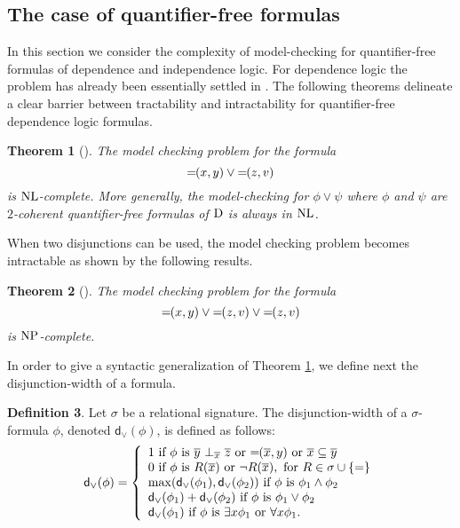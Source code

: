\documentclass{article}
\theoremstyle{plain}
\newtheorem{theorem}{Theorem}
\theoremstyle{definition}
\newtheorem{definition}[theorem]{Definition}
\newcommand{\sg}{\sigma}
\newcommand*\dep{{=\mkern-1.2mu}}
\newcommand{\df}{\rm{D}}
\newcommand{\np}{{\rm NP}}
\newcommand{\nl}{{\rm NL}}
\newcommand{\tu}[1]{\overline{#1}}
\newcommand{\indep}[3]{{#1}\ \bot_{#2}\ {#3}}
\newcommand{\Disjunctiondepth}[1]{\textsf{d}_{\vee}(#1)}
\begin{document}
\subsection{The case of quantifier-free formulas}
In this section we consider the complexity of model-checking for quantifier-free formulas of dependence and independence logic. For dependence logic the problem has  already been essentially settled in \cite{kontinenj13}.  The following theorems delineate a clear barrier between tractability and intractability for quantifier-free dependence logic formulas.
\begin{theorem}[\cite{kontinenj13}]\label{JarmoKontinenNL} The model checking problem for the formula 
$$\dep(x,y)\vee \dep(z,v)$$ 
is $\nl$-complete. More generally, the model-checking for $\phi \vee \psi$ where $\phi$ and $\psi$ are $2$-coherent quantifier-free formulas of $\df$ is always in $\nl$.
\end{theorem}

When  two disjunctions can be used, the model checking problem becomes intractable as shown by the following results.

\begin{theorem}[\cite{kontinenj13}]\label{JarmoKontinenNP}
The model checking problem for the formula 
$$\dep(x,y)\vee \dep(z,v) \vee \dep(z,v)$$
 is $\np$-complete.
\end{theorem}




In order to give a syntactic generalization of  Theorem \ref{JarmoKontinenNL}, we define next the disjunction-width of a formula. 


\begin{definition} Let $\sigma$ be a relational signature. The disjunction-width of a $\sigma$-formula $\phi$, denoted $\Disjunctiondepth{\phi}$, is defined as follows:
\[
\Disjunctiondepth{\phi}=
\left\{\begin{array}{l}
1  \mbox{ if } \phi  \mbox{ is } \indep{\tu y}{\tu x }{\tu z} \mbox{ or }  \dep(\tu x, y) \mbox{ or } \tu x\subseteq \tu y\\
0   \mbox{ if } \phi \mbox{ is } R(\tu x)  \mbox{ or }   \neg R(\tu x),    \mbox{ for } R\in \sg\cup\{=\}\\
\max (\Disjunctiondepth{\phi_1}, \Disjunctiondepth{\phi_2}) \mbox{ if } \phi \mbox{ is } \phi_1\wedge\phi_2 \\
\Disjunctiondepth{\phi_1} + \Disjunctiondepth{\phi_2} \mbox{ if } \phi \mbox{ is } \phi_1\vee\phi_2 \\
\Disjunctiondepth{\phi_1}  \mbox{ if } \phi \mbox{ is } \exists x \phi_1 \mbox{ or } \forall x \phi_1.
\end{array}\right.
\]
\end{definition}
\end{document}
